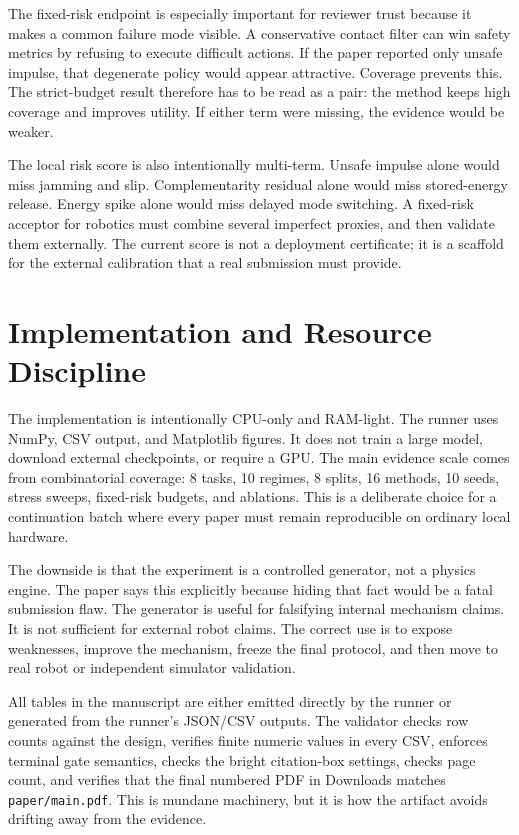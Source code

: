 \documentclass{article}
\begin{document}
The fixed-risk endpoint is especially important for reviewer trust because it makes a common failure mode visible. A conservative contact filter can win safety metrics by refusing to execute difficult actions. If the paper reported only unsafe impulse, that degenerate policy would appear attractive. Coverage prevents this. The strict-budget result therefore has to be read as a pair: the method keeps high coverage and improves utility. If either term were missing, the evidence would be weaker.

The local risk score is also intentionally multi-term. Unsafe impulse alone would miss jamming and slip. Complementarity residual alone would miss stored-energy release. Energy spike alone would miss delayed mode switching. A fixed-risk acceptor for robotics must combine several imperfect proxies, and then validate them externally. The current score is not a deployment certificate; it is a scaffold for the external calibration that a real submission must provide.

\clearpage
\section{Implementation and Resource Discipline}
The implementation is intentionally CPU-only and RAM-light. The runner uses NumPy, CSV output, and Matplotlib figures. It does not train a large model, download external checkpoints, or require a GPU. The main evidence scale comes from combinatorial coverage: 8 tasks, 10 regimes, 8 splits, 16 methods, 10 seeds, stress sweeps, fixed-risk budgets, and ablations. This is a deliberate choice for a continuation batch where every paper must remain reproducible on ordinary local hardware.

The downside is that the experiment is a controlled generator, not a physics engine. The paper says this explicitly because hiding that fact would be a fatal submission flaw. The generator is useful for falsifying internal mechanism claims. It is not sufficient for external robot claims. The correct use is to expose weaknesses, improve the mechanism, freeze the final protocol, and then move to real robot or independent simulator validation.

All tables in the manuscript are either emitted directly by the runner or generated from the runner's JSON/CSV outputs. The validator checks row counts against the design, verifies finite numeric values in every CSV, enforces terminal gate semantics, checks the bright citation-box settings, checks page count, and verifies that the final numbered PDF in Downloads matches \texttt{paper/main.pdf}. This is mundane machinery, but it is how the artifact avoids drifting away from the evidence.
\end{document}
